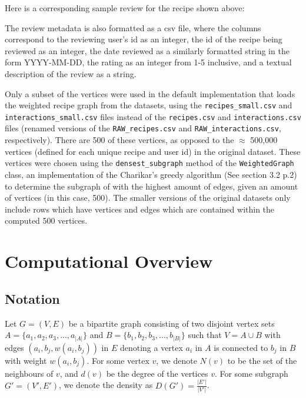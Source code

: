 \documentclass[fontsize=11pt]{article}
\begin{document}
Here is a corresponding sample review for the recipe shown above:
The review metadata is also formatted as a csv file, where the columns correspond to the reviewing user's id as an integer, the id of the recipe being reviewed as an integer, the date reviewed as a similarly formatted string in the form YYYY-MM-DD, the rating as an integer from 1-5 inclusive, and a textual description of the review as a string. 

Only a subset of the vertices were used in the default implementation that loads the weighted recipe graph from the datasets, using the \texttt{recipes\_small.csv} and \texttt{interactions\_small.csv} files instead of the \texttt{recipes.csv} and \texttt{interactions.csv} files (renamed versions of the \texttt{RAW\_recipes.csv} and \texttt{RAW\_interactions.csv}, respectively). There are 500 of these vertices, as opposed to the $\approx$ 500,000 vertices (defined for each unique recipe and user id) in the original dataset. These vertices were chosen using the \texttt{densest\_subgraph} method of the \texttt{WeightedGraph} class, an implementation of the Charikar's greedy algorithm (See section 3.2 p.2) to determine the subgraph of with the highest amount of edges, given an amount of vertices (in this case, 500). The smaller versions of the original datasets only include rows which have vertices and edges which are contained within the computed 500 vertices. 

\section{Computational Overview}
\subsection{Notation}
Let $G = (V, E)$ be a bipartite graph consisting of two disjoint vertex sets $A = \{a_1, a_2, a_3, ..., a_{|A|}\}$ and $B = \{b_1, b_2, b_3, ..., b_{|B|}\}$ such that $V = A \cup B$ with edges $(a_i, b_j, w(a_i, b_j))$ in $E$ denoting a vertex $a_i$ in $A$ is connected to $b_j$ in $B$ with weight $w(a_i, b_j)$. For some vertex $v$, we denote $N(v)$ to be the set of the neighbours of $v$, and $d(v)$ be the degree of the vertices $v$. For some subgraph $G'=(V', E')$, we denote the density as $D(G') = \frac{\lvert E' \rvert}{\lvert V' \rvert}$. 
\end{document}
